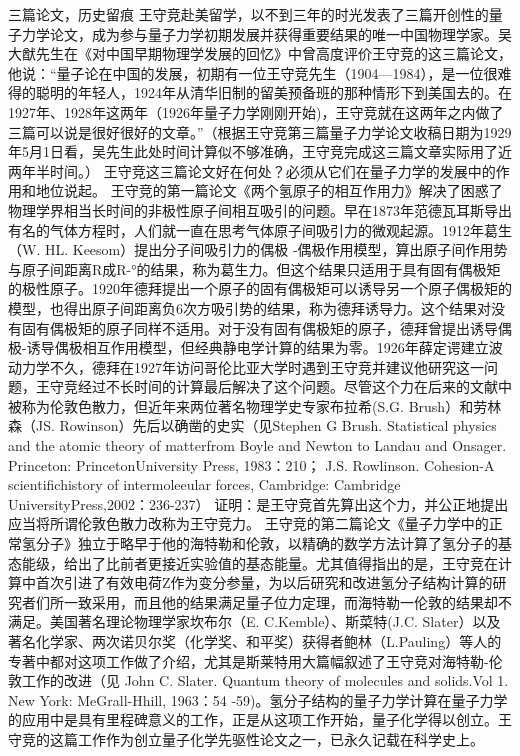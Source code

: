 三篇论文，历史留痕
王守竞赴美留学，以不到三年的时光发表了三篇开创性的量子力学论文，成为参与量子力学初期发展并获得重要结果的唯一中国物理学家。吴大猷先生在《对中国早期物理学发展的回忆》中曾高度评价王守竞的这三篇论文，他说：“量子论在中国的发展，初期有一位王守竞先生（1904—1984），是一位很难得的聪明的年轻人，1924年从清华旧制的留美预备班的那种情形下到美国去的。在1927年、1928年这两年（1926年量子力学刚刚开始)，王守竞就在这两年之内做了三篇可以说是很好很好的文章。”（根据王守竞第三篇量子力学论文收稿日期为1929年5月1日看，吴先生此处时间计算似不够准确，王守竞完成这三篇文章实际用了近两年半时间。）
王守竞这三篇论文好在何处？必须从它们在量子力学的发展中的作用和地位说起。
王守竞的第一篇论文《两个氢原子的相互作用力》解决了困惑了物理学界相当长时间的非极性原子间相互吸引的问题。早在1873年范德瓦耳斯导出有名的气体方程时，人们就一直在思考气体原子间吸引力的微观起源。1912年葛生（W. HL. Keesom）提出分子间吸引力的偶极 -偶极作用模型，算出原子间作用势与原子间距离R成R-°的结果，称为葛生力。但这个结果只适用于具有固有偶极矩的极性原子。1920年德拜提出一个原子的固有偶极矩可以诱导另一个原子偶极矩的模型，也得出原子间距离负6次方吸引势的结果，称为德拜诱导力。这个结果对没有固有偶极矩的原子同样不适用。对于没有固有偶极矩的原子，德拜曾提出诱导偶极-诱导偶极相互作用模型，但经典静电学计算的结果为零。1926年薛定谔建立波动力学不久，德拜在1927年访问哥伦比亚大学时遇到王守竞并建议他研究这一问题，王守竞经过不长时间的计算最后解决了这个问题。尽管这个力在后来的文献中被称为伦敦色散力，但近年来两位著名物理学史专家布拉希(S.G. Brush）和劳林森（JS. Rowinson）先后以确凿的史实（见Stephen G Brush. Statistical physics and the atomic theory of matterfrom Boyle and Newton to Landau and Onsager. Princeton: PrincetonUniversity Press, 1983：210； J.S. Rowlinson. Cohesion-A scientifichistory of intermoleeular forces, Cambridge: Cambridge UniversityPress,2002：236-237） 证明：是王守竞首先算出这个力，并公正地提出应当将所谓伦敦色散力改称为王守竞力。
王守竞的第二篇论文《量子力学中的正常氢分子》独立于略早于他的海特勒和伦敦，以精确的数学方法计算了氢分子的基态能级，给出了比前者更接近实验值的基态能量。尤其值得指出的是，王守竞在计算中首次引进了有效电荷Z作为变分参量，为以后研究和改进氢分子结构计算的研究者们所一致采用，而且他的结果满足量子位力定理，而海特勒一伦敦的结果却不满足。美国著名理论物理学家坎布尔（E. C.Kemble）、斯菜特(J.C. Slater）以及著名化学家、两次诺贝尔奖（化学奖、和平奖）获得者鲍林（L.Pauling）等人的专著中都对这项工作做了介绍，尤其是斯莱特用大篇幅叙述了王守竞对海特勒-伦敦工作的改进（见 John C. Slater. Quantum theory of molecules and solids.Vol 1. New York: MeGrall-Hhill, 1963：54 -59)。氢分子结构的量子力学计算在量子力学的应用中是具有里程碑意义的工作，正是从这项工作开始，量子化学得以创立。王守竞的这篇工作作为创立量子化学先驱性论文之一，已永久记载在科学史上。
